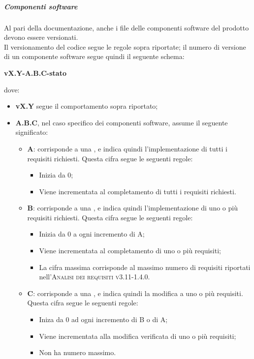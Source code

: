 \documentclass[../norme-di-progetto.tex]{subfiles}
\begin{document}
\subparagraph{Componenti software}
Al pari della documentazione, anche i file delle componenti software del prodotto devono essere versionati. \\
Il versionamento del codice segue le regole sopra riportate; il numero di versione di un componente software segue quindi il seguente schema:
\begin{center}
  \centering
  \textbf{vX.Y-A.B.C-stato}
\end{center} dove:
\begin{itemize}
  \item \textbf{vX.Y} segue il comportamento sopra riportato;
  \item \textbf{A.B.C}, nel caso specifico dei componenti software, assume il seguente significato:
  \begin{itemize}
    \item \textbf{A}: corrisponde a una , e indica quindi l'implementazione di tutti i requisiti richiesti. Questa cifra segue le seguenti regole:
    \begin{itemize}
      \item Inizia da 0;
      \item Viene incrementata al completamento di tutti i requisiti richiesti.
    \end{itemize}
    \item \textbf{B}: corrisponde a una , e indica quindi l'implementazione di uno o più requisiti richiesti. Questa cifra segue le seguenti regole:
    \begin{itemize}
      \item Inizia da 0 a ogni incremento di A;
      \item Viene incrementata al completamento di uno o più requisiti;
      \item La cifra massima corrisponde al massimo numero di requisiti riportati nell'\textsc{Analisi dei requisiti v3.11-1.4.0}.
    \end{itemize}
    \item \textbf{C}: corrisponde a una , e indica quindi la modifica a uno o più requisiti. Questa cifra segue le seguenti regole:
    \begin{itemize}
      \item Iniza da 0 ad ogni incremento di B o di A;
      \item Viene incrementata alla modifica verificata di uno o più requisiti;
      \item Non ha numero massimo.
    \end{itemize}

\end{itemize}
\end{itemize}
\end{document}
